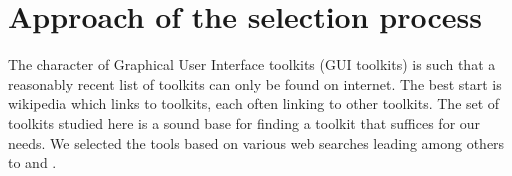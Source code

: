 \section{Approach of the selection process}

The character of Graphical User Interface toolkits (GUI toolkits) is such that
a reasonably recent list of toolkits can only be found on internet. The best
start is wikipedia which links to toolkits, each often linking to other
toolkits. The set of toolkits studied here is a sound base for finding a
toolkit that suffices for our needs. We selected the tools based on various web
searches leading among others to \cite{wiki:xplatf} and \cite{wiki:xplatf_gui}.  
